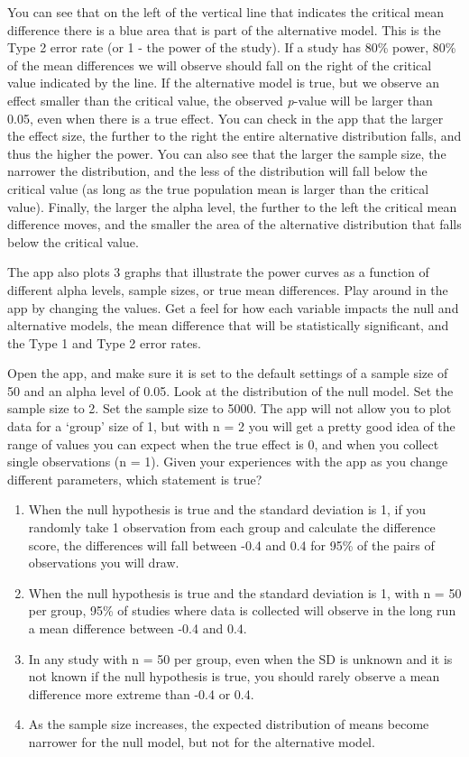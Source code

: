 \documentclass[
  oneside]{book}
\providecommand{\tightlist}{%
  \setlength{\itemsep}{0pt}\setlength{\parskip}{0pt}}
\begin{document}
You can see that on the left of the vertical line that indicates the critical mean difference there is a blue area that is part of the alternative model. This is the Type 2 error rate (or 1 - the power of the study). If a study has 80\% power, 80\% of the mean differences we will observe should fall on the right of the critical value indicated by the line. If the alternative model is true, but we observe an effect smaller than the critical value, the observed \emph{p}-value will be larger than 0.05, even when there is a true effect. You can check in the app that the larger the effect size, the further to the right the entire alternative distribution falls, and thus the higher the power. You can also see that the larger the sample size, the narrower the distribution, and the less of the distribution will fall below the critical value (as long as the true population mean is larger than the critical value). Finally, the larger the alpha level, the further to the left the critical mean difference moves, and the smaller the area of the alternative distribution that falls below the critical value.

The app also plots 3 graphs that illustrate the power curves as a function of different alpha levels, sample sizes, or true mean differences. Play around in the app by changing the values. Get a feel for how each variable impacts the null and alternative models, the mean difference that will be statistically significant, and the Type 1 and Type 2 error rates.

Open the app, and make sure it is set to the default settings of a sample size of 50 and an alpha level of 0.05. Look at the distribution of the null model. Set the sample size to 2. Set the sample size to 5000. The app will not allow you to plot data for a `group' size of 1, but with n = 2 you will get a pretty good idea of the range of values you can expect when the true effect is 0, and when you collect single observations (n = 1). Given your experiences with the app as you change different parameters, which statement is true?

\begin{enumerate}
\def\labelenumi{\Alph{enumi})}
\tightlist
\item
  When the null hypothesis is true and the standard deviation is 1, if you randomly take 1 observation from each group and calculate the difference score, the differences will fall between -0.4 and 0.4 for 95\% of the pairs of observations you will draw.
\item
  When the null hypothesis is true and the standard deviation is 1, with n = 50 per group, 95\% of studies where data is collected will observe in the long run a mean difference between -0.4 and 0.4.
\item
  In any study with n = 50 per group, even when the SD is unknown and it is not known if the null hypothesis is true, you should rarely observe a mean difference more extreme than -0.4 or 0.4.
\item
  As the sample size increases, the expected distribution of means become narrower for the null model, but not for the alternative model.
\end{enumerate}
\end{document}
